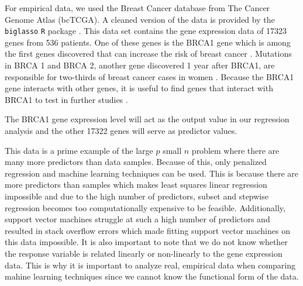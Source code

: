\documentclass{article}
\begin{document}
	For empirical data, we used the Breast Cancer database from The Cancer Genome Atlas (bcTCGA). A cleaned version of the data is provided by the \lstinline!biglasso! \lstinline!R! package \cite{zeng2017biglasso}. This data set contains the gene expression data of 17323 genes from 536 patients. One of these genes is the BRCA1 gene which is among the first genes discovered that can increase the risk of breast cancer \cite{kuchenbaecker2017risks, antoniou2003average}. Mutations in BRCA 1 and BRCA 2, another gene discovered 1 year after BRCA1, are responsible for two-thirds of breast cancer cases in women \cite{deng2000roles}. Because the BRCA1 gene interacts with other genes, it is useful to find genes that interact with BRCA1 to test in further studies \cite{deng2000roles}. 

	The BRCA1 gene expression level will act as the output value in our regression analysis and the other 17322 genes will serve as predictor values.
	

	
	This data is a prime example of the large $p$ small $n$ problem where there are many more predictors than data samples. Because of this, only penalized regression and machine learning techniques can be used. This is because there are more predictors than samples which makes least squares linear regression impossible and due to the high number of predictors, subset and stepwise regression becomes too computationally expensive to be feasible. Additionally, support vector machines struggle at such a high number of predictors and resulted in stack overflow errors which made fitting support vector machines on this data impossible. It is also important to note that we do not know whether the response variable is related linearly or non-linearly to the gene expression data. This is why it is important to analyze real, empirical data when comparing mahine learning techniques since we cannot know the functional form of the data.
	
\end{document}
